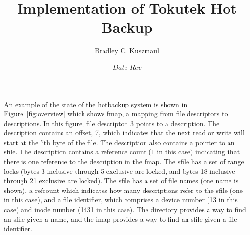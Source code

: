\documentclass[10pt]{article}
\title{Implementation of Tokutek Hot Backup}
\author{Bradley C. Kuszmaul}
\date{$Date$  $Rev$}
\newcommand{\figref}[1]{Figure~\ref{fig:#1}}
\begin{document}
\maketitle

An example of the state of the hotbackup system is shown in
\figref{overview} which shows fmap, a mapping from file descriptors to
descriptions.  In this figure, file descriptor~3 points to a
description.  The description contains an offset, 7, which indicates
that the next read or write will start at the 7th byte of the file.
The description also contains a pointer to an sfile.  The description
contains a reference count (1 in this case) indicating that there is
one reference to the description in the fmap.  The sfile has a set of
range locks (bytes 3 inclusive through 5 exclusive are locked, and
bytes 18 inclusive through 21 exclusive are locked).  The sfile has a
set of file names (one name is shown), a refcount which indicates how
many descriptions refer to the sfile (one in this case), and a file
identifier, which comprises a device number (13 in this case) and
inode number (1431 in this case).  The directory provides a way to
find an sfile given a name, and the imap provides a way to find an
sfile given a file identifier.
\end{document}
